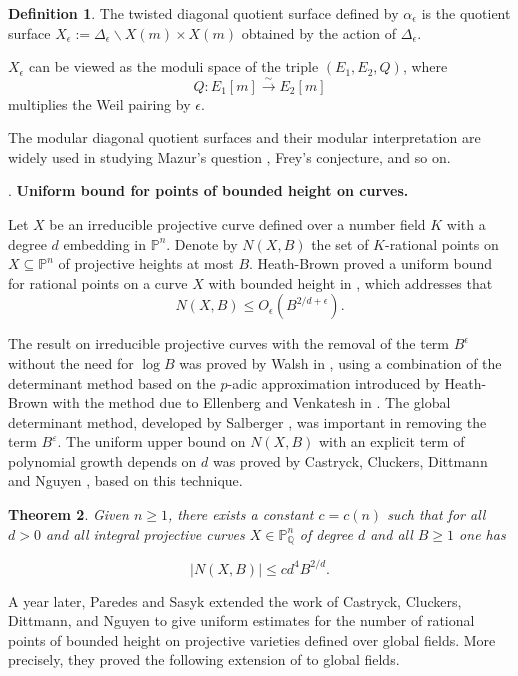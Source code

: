 \documentclass[12pt]{amsart}
\newtheorem{thm}{Theorem}[section]
\theoremstyle{definition}
\newtheorem{defn}[thm]{Definition}
\theoremstyle{remark}
\numberwithin{equation}{section}
\newcommand{\Q}{\mathbb{Q}}
\renewcommand{\P}{\mathbb{P}}
\begin{document}
\begin{defn}
	The twisted diagonal quotient surface defined by $\alpha_{\epsilon}$ is the quotient surface $X_{\epsilon}:= \Delta_{\epsilon} \backslash X(m) \times X(m) $ obtained by the action of $\Delta_{\epsilon}$.
\end{defn}
$X_{\epsilon}$ can be viewed as the moduli space of the triple $(E_1, E_2, Q)$, where 
$$Q: E_{1}[m] \stackrel{\sim}{\rightarrow} E_{2}[m] $$
multiplies the Weil pairing by $\epsilon$.

The modular diagonal quotient surfaces and their modular interpretation are widely used in studying Mazur's question\cite{Maz78} \cite{HK00}, Frey's conjecture\cite{Fre97}, and so on.  


\vspace{1em}
. \textbf{Uniform bound for points of bounded height on curves.}   

Let $X$ be an irreducible projective curve defined over a number field $K$ with a degree $d$ embedding in $\P^{n}$. Denote by $N(X,B)$ the set of $K$-rational points on $X \subseteq \P^{n}$ of projective heights at most $B$. 
Heath-Brown proved a uniform bound for rational points on a curve $X$ with bounded height in \cite[Theorem 5]{Heath-Brown}, which addresses that 
$$N(X,B) \le O_{\epsilon }(B^{2/d+\epsilon}).$$

The result on irreducible projective curves with the removal of the term $B^{\epsilon}$ without the need for $\log B$ was proved by Walsh in \cite{Walsh}, using a combination of the determinant method based on the $p$-adic approximation introduced by Heath-Brown \cite{Heath-Brown} with the method due to Ellenberg and Venkatesh in \cite{EV05}. The global determinant method, developed by Salberger \cite{Sal23}, was important in removing the term $B^\varepsilon$. The uniform upper bound on $N(X,B)$ with an explicit term of polynomial growth depends on $d$ was proved by Castryck, Cluckers, Dittmann and Nguyen \cite{CCDN19}, based on this technique. 

\begin{thm}\cite[Theorem 2]{CCDN19}\label{CCDN}
	Given $n \ge 1$, there exists a constant $c=c(n)$ such that for all $d > 0$ and all integral projective curves $X \in \P^{n}_{\Q}$ of degree $d$ and all $B \ge 1$ one has
	
	$$\vert   N(X,B)\vert    \le cd^{4}B^{2/d}.$$
	
\end{thm}

A year later, Paredes and Sasyk \cite{PS22} extended the work of Castryck, Cluckers, Dittmann, and Nguyen to give uniform estimates for the number of rational points of bounded height on projective varieties defined over global fields. More precisely, they proved the following extension of \cite[Theorem 2]{CCDN19} to global fields.
\end{document}
